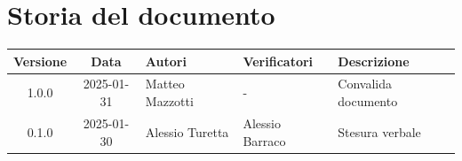 \section*{Storia del documento}
\begin{tabularx}{\textwidth}{ c c p{2.75cm} p{2.75cm} X }
    \rowcolor{gray!20}\rule{0pt}{0.5cm}\textbf{Versione} & \textbf{Data} & \textbf{Autori} & \textbf{Verificatori} & \textbf{Descrizione} \\[0.7ex]
    \hline
    \rule{0pt}{0.5cm}1.0.0 & 2025-01-31 & Matteo Mazzotti & - & Convalida documento\\[0.7ex]
    \hline
    \rule{0pt}{0.5cm}0.1.0 & 2025-01-30 & Alessio Turetta & Alessio Barraco & Stesura verbale\\[0.7ex]
\end{tabularx}
